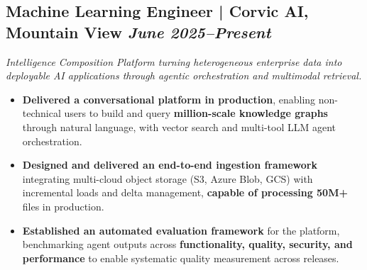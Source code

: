 \documentclass[10pt,a4paper]{article}
\begin{document}
\subsection{Machine Learning Engineer | Corvic AI, Mountain View \hfill
\textit{June 2025--Present}}
\textit{Intelligence Composition Platform turning heterogeneous enterprise data into deployable AI applications through agentic orchestration and multimodal retrieval.}
\begin{itemize}
    \item \textbf{Delivered a conversational platform in production}, enabling non-technical users to build and query \textbf{million-scale knowledge graphs} through natural language, with vector search and multi-tool LLM agent orchestration.
    \item \textbf{Designed and delivered an end-to-end ingestion framework} integrating multi-cloud object storage (S3, Azure Blob, GCS) with incremental loads and delta management, \textbf{capable of processing 50M+} files in production.
    \item \textbf{Established an automated evaluation framework} for the platform, benchmarking agent outputs across \textbf{functionality, quality, security, and performance} to enable systematic quality measurement across releases.
\end{itemize}
\vspace{0.3em}
\end{document}
